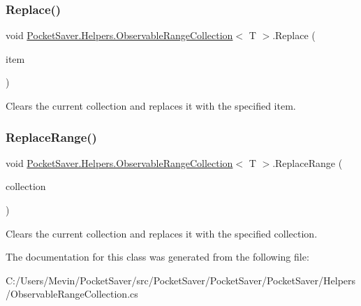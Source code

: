 \subsubsection{\texorpdfstring{Replace()}{Replace()}}
{\footnotesize\ttfamily void \hyperlink{class_pocket_saver_1_1_helpers_1_1_observable_range_collection}{Pocket\+Saver.\+Helpers.\+Observable\+Range\+Collection}$<$ T $>$.Replace (\begin{DoxyParamCaption}\item[{T}]{item }\end{DoxyParamCaption})\hspace{0.3cm}{\ttfamily [inline]}}



Clears the current collection and replaces it with the specified item. 

\mbox{\label{class_pocket_saver_1_1_helpers_1_1_observable_range_collection_ac324fbc1de2bad4abe3c31252e94277f}} 
\subsubsection{\texorpdfstring{Replace\+Range()}{ReplaceRange()}}
{\footnotesize\ttfamily void \hyperlink{class_pocket_saver_1_1_helpers_1_1_observable_range_collection}{Pocket\+Saver.\+Helpers.\+Observable\+Range\+Collection}$<$ T $>$.Replace\+Range (\begin{DoxyParamCaption}\item[{I\+Enumerable$<$ T $>$}]{collection }\end{DoxyParamCaption})\hspace{0.3cm}{\ttfamily [inline]}}



Clears the current collection and replaces it with the specified collection. 



The documentation for this class was generated from the following file\+:\begin{DoxyCompactItemize}
\item 
C\+:/\+Users/\+Mevin/\+Pocket\+Saver/src/\+Pocket\+Saver/\+Pocket\+Saver/\+Pocket\+Saver/\+Helpers/Observable\+Range\+Collection.\+cs\end{DoxyCompactItemize}
